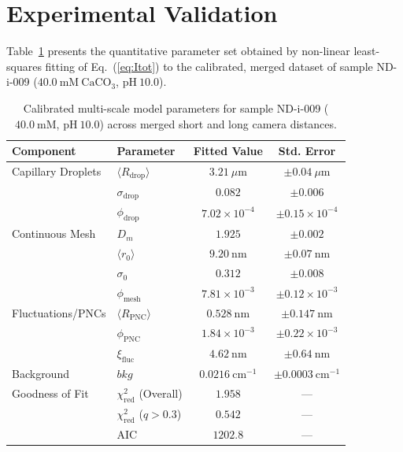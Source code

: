 \documentclass[11pt,a4paper]{article}
\begin{document}
\section{Experimental Validation}

Table~\ref{tab:params} presents the quantitative parameter set obtained by non-linear least-squares fitting of Eq.~(\ref{eq:Itot}) to the calibrated, merged dataset of sample ND-i-009 ($40.0\ \mathrm{mM}\ \mathrm{CaCO}_3$, $\mathrm{pH}\ 10.0$).

\begin{table}[htbp]
\centering
\caption{\label{tab:params}Calibrated multi-scale model parameters for sample ND-i-009 ($40.0\ \mathrm{mM}$, $\mathrm{pH}\ 10.0$) across merged short and long camera distances.}
\vspace{2mm}
\begin{tabular}{llcc}
\toprule
\textbf{Component} & \textbf{Parameter} & \textbf{Fitted Value} & \textbf{Std. Error} \\
\midrule
Capillary Droplets & $\langle R_{\mathrm{drop}} \rangle$ & $3.21\ \mu\mathrm{m}$ & $\pm 0.04\ \mu\mathrm{m}$ \\
& $\sigma_{\mathrm{drop}}$ & $0.082$ & $\pm 0.006$ \\
& $\phi_{\mathrm{drop}}$ & $7.02 \times 10^{-4}$ & $\pm 0.15 \times 10^{-4}$ \\
\midrule
Continuous Mesh & $D_m$ & $1.925$ & $\pm 0.002$ \\
& $\langle r_0 \rangle$ & $9.20\ \mathrm{nm}$ & $\pm 0.07\ \mathrm{nm}$ \\
& $\sigma_0$ & $0.312$ & $\pm 0.008$ \\
& $\phi_{\mathrm{mesh}}$ & $7.81 \times 10^{-3}$ & $\pm 0.12 \times 10^{-3}$ \\
\midrule
Fluctuations/PNCs & $\langle R_{\mathrm{PNC}} \rangle$ & $0.528\ \mathrm{nm}$ & $\pm 0.147\ \mathrm{nm}$ \\
& $\phi_{\mathrm{PNC}}$ & $1.84 \times 10^{-3}$ & $\pm 0.22 \times 10^{-3}$ \\
& $\xi_{\mathrm{fluc}}$ & $4.62\ \mathrm{nm}$ & $\pm 0.64\ \mathrm{nm}$ \\
\midrule
Background & $bkg$ & $0.0216\ \mathrm{cm}^{-1}$ & $\pm 0.0003\ \mathrm{cm}^{-1}$ \\
\midrule
Goodness of Fit & $\chi^2_{\mathrm{red}}$ (Overall) & $\mathbf{1.958}$ & --- \\
& $\chi^2_{\mathrm{red}}$ ($q > 0.3$) & $\mathbf{0.542}$ & --- \\
& AIC & $\mathbf{1202.8}$ & --- \\
\bottomrule
\end{tabular}
\end{table}
\end{document}
